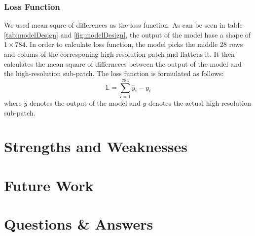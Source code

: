 \documentclass{article}
\begin{document}
\subsubsection{Loss Function}
We used mean squre of
differences as the loss function. As can be
seen in table \ref{tab:modelDesign} and 
\ref{fig:modelDesign}, the output of
the model hase a shape of $1 \times 784$.
In order to calculate loss function,
the model picks the middle 28 rows and colums of the
corresponing high-resolution patch and flattens
it. It then calculates the mean square of differneces
between the output of the model and the high-resolution
sub-patch. The loss function is formulated as follows:
\begin{equation}
    \mathbb{L} = \sum_{i=1}^{784}{\hat{y}_i - y_i}
\end{equation}
where $\hat{y}$ denotes the output of the model and
$y$ denotes the actual high-resolution sub-patch.

\section{Strengths and Weaknesses}

\section{Future Work}

\section{Questions \& Answers}





\begin{acronym}
\end{acronym}
\end{document}
